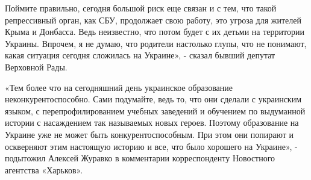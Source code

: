 Поймите правильно, сегодня большой риск еще связан и с тем, что такой
репрессивный орган, как СБУ, продолжает свою работу, это угроза для жителей
Крыма и Донбасса. Ведь неизвестно, что потом будет с их детьми на территории
Украины. Впрочем, я не думаю, что родители настолько глупы, что не понимают,
какая ситуация сегодня сложилась на Украине», - сказал бывший депутат Верховной
Рады.

«Тем более что на сегодняшний день украинское образование неконкурентоспособно.
Сами подумайте, ведь то, что они сделали с украинским языком, с
перепрофилированием учебных заведений и обучением по выдуманной истории с
насаждением так называемых новых героев. Поэтому образование на Украине уже не
может быть конкурентоспособным. При этом они попирают и оскверняют этим
настоящую историю и все, что было хорошего на Украине», - подытожил Алексей
Журавко в комментарии корреспонденту Новостного агентства «Харьков».
